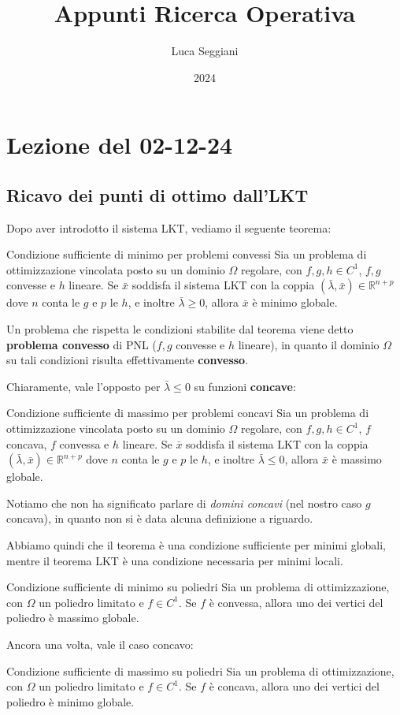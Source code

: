 \documentclass[a4paper,11pt]{article}
\title{Appunti Ricerca Operativa}
\author{Luca Seggiani}
\date{2024}
\begin{document}
\section{Lezione del 02-12-24}

\thispagestyle{empty}
\pagestyle{fancy}

\subsection{Ricavo dei punti di ottimo dall'LKT}
Dopo aver introdotto il sistema LKT, vediamo il seguente teorema:
\begin{theorem}{Condizione sufficiente di minimo per problemi convessi}
	Sia un problema di ottimizzazione vincolata posto su un dominio $\Omega$ regolare, con $f, g, h \in C^1$, $f, g$ convesse e $h$ lineare.
	Se $\bar{x}$ soddisfa il sistema LKT con la coppia $(\bar{\lambda}, \bar{x}) \in \mathbb{R}^{n+p}$ dove $n$ conta le $g$ e $p$ le $h$, e inoltre $\bar{\lambda} \geq 0$, allora $\bar{x}$ è minimo globale. 
\end{theorem}

Un problema che rispetta le condizioni stabilite dal teorema viene detto \textbf{problema convesso} di PNL ($f, g$ convesse e $h$ lineare), in quanto il dominio $\Omega$ su tali condizioni risulta effettivamente \textbf{convesso}.

Chiaramente, vale l'opposto per $\bar{\lambda} \leq 0$ su funzioni \textbf{concave}:
\begin{theorem}{Condizione sufficiente di massimo per problemi concavi}
	Sia un problema di ottimizzazione vincolata posto su un dominio $\Omega$ regolare, con $f, g, h \in C^1$, $f$ concava, $f$ convessa e $h$ lineare.
	Se $\bar{x}$ soddisfa il sistema LKT con la coppia $(\bar{\lambda}, \bar{x}) \in \mathbb{R}^{n+p}$ dove $n$ conta le $g$ e $p$ le $h$, e inoltre $\bar{\lambda} \leq 0$, allora $\bar{x}$ è massimo globale. 
\end{theorem}

Notiamo che non ha significato parlare di \textit{domini concavi} (nel nostro caso $g$ concava), in quanto non si è data alcuna definizione a riguardo.

Abbiamo quindi che il teorema è una condizione sufficiente per minimi globali, mentre il teorema LKT è una condizione necessaria per minimi locali. 

\begin{theorem}{Condizione sufficiente di minimo su poliedri}
	Sia un problema di ottimizzazione, con $\Omega$ un poliedro limitato e $f \in C^1$.
	Se $f$ è convessa, allora uno dei vertici del poliedro è massimo globale.
\end{theorem}

Ancora una volta, vale il caso concavo:
\begin{theorem}{Condizione sufficiente di massimo su poliedri}
	Sia un problema di ottimizzazione, con $\Omega$ un poliedro limitato e $f \in C^1$.
	Se $f$ è concava, allora uno dei vertici del poliedro è minimo globale.
\end{theorem}
\end{document}
